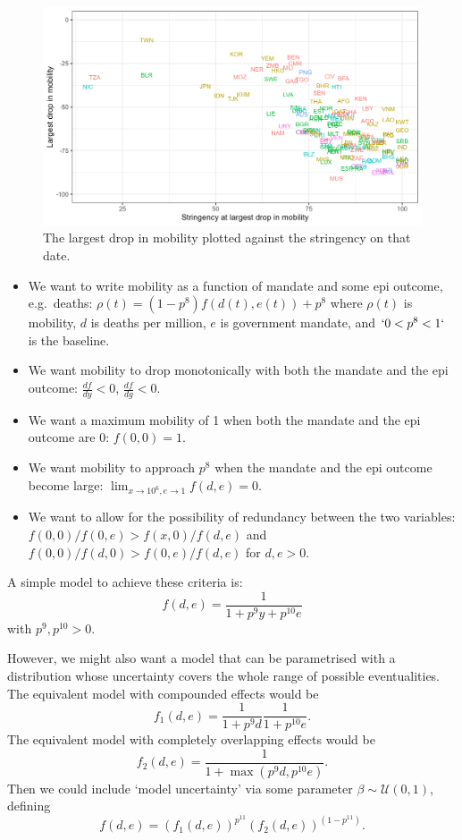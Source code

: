 \documentclass[
]{article}
\providecommand{\tightlist}{%
  \setlength{\itemsep}{0pt}\setlength{\parskip}{0pt}}
\begin{document}
\begin{figure}
\includegraphics[width=41.67in]{README_files/figure-gfm/mobilitydrop} \caption{The largest drop in mobility plotted against the stringency on that date.}\label{fig:mobilitydrop}
\end{figure}

\begin{itemize}
\tightlist
\item
  We want to write mobility as a function of mandate and some epi outcome, e.g.~deaths: \(\rho(t) = (1-p^8)f(d(t),e(t)) + p^8\) where \(\rho(t)\) is mobility, \(d\) is deaths per million, \(e\) is government mandate, and \(`0 < p^8 < 1`\) is the baseline.
\item
  We want mobility to drop monotonically with both the mandate and the epi outcome: \(\frac{df}{dy}<0\), \(\frac{df}{dg}<0\).
\item
  We want a maximum mobility of 1 when both the mandate and the epi outcome are 0: \(f(0,0)=1\).
\item
  We want mobility to approach \(p^8\) when the mandate and the epi outcome become large: \(\lim_{x\to 10^6, e\to 1}f(d,e)= 0\).
\item
  We want to allow for the possibility of redundancy between the two variables: \(f(0,0)/f(0,e) > f(x,0)/f(d,e)\) and \(f(0,0)/f(d,0) > f(0,e)/f(d,e)\) for \(d,e>0\).
\end{itemize}

A simple model to achieve these criteria is: \[f(d,e) = \frac{1}{1+p^9y+p^{10}e}\]
with \(p^9, p^{10}>0\).

However, we might also want a model that can be parametrised with a distribution whose uncertainty covers the whole range of possible eventualities. The equivalent model with compounded effects would be \[f_1(d,e) = \frac{1}{1+p^9 d}\frac{1}{1+p^{10}e}.\] The equivalent model with completely overlapping effects would be \[f_2(d,e) = \frac{1}{1+\max(p^9 d,p^{10}e)}.\] Then we could include `model uncertainty' via some parameter \(\beta\sim\mathcal{U}(0,1)\), defining \[f(d,e) = (f_1(d,e))^{p^{11}}(f_2(d,e))^{(1-p^{11})}.\]
\end{document}
